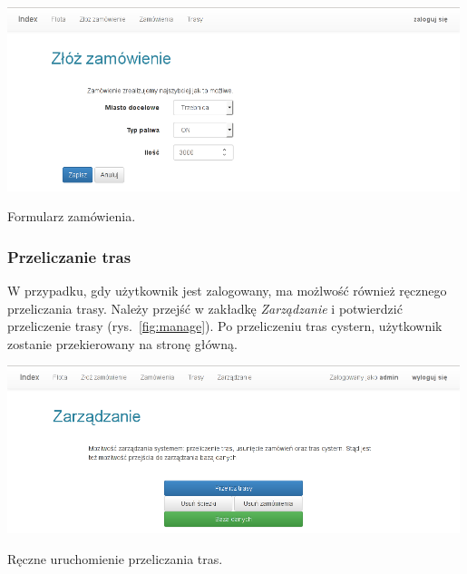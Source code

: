 \documentclass[11pt,a4paper,oneside]{mwart}
\begin{document}
\begin{wykres}[htbp]
  \centering
  \includegraphics[width=0.99\textwidth]{pics/order_form.png}
  \caption{Formularz zamówienia.}
  \label{fig:order_form}
\end{wykres}

\subsubsection{Przeliczanie tras}
W przypadku, gdy użytkownik jest zalogowany, ma możlwość również ręcznego przeliczania trasy. Należy przejść w zakładkę \emph{Zarządzanie} i potwierdzić przeliczenie trasy (rys.~\ref{fig:manage}). Po przeliczeniu tras cystern, użytkownik zostanie przekierowany na stronę główną.
\begin{wykres}[htbp]
  \centering
  \includegraphics[width=0.99\textwidth]{pics/manage.png}
  \caption{Ręczne uruchomienie przeliczania tras.}
  \label{fig:manage}
\end{wykres}
\end{document}

